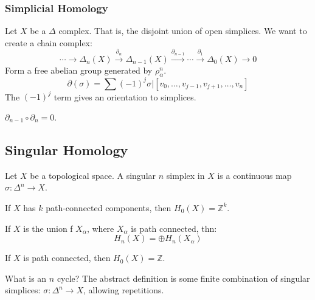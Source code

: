 \documentclass[crop=false,class=book,oneside]{standalone}
\begin{document}
            \subsubsection{Simplicial Homology}
                Let $X$ be a $\Delta$ complex. That is, the
                disjoint union of open simplices. We want to create
                a chain complex:
                \begin{equation}
                    \cdots\longrightarrow\Delta_{n}(X)
                    \overset{\partial_{n}}{\longrightarrow}
                    \Delta_{n-1}(X)
                    \overset{\partial_{n-1}}{\longrightarrow}
                    \cdots
                    \overset{\partial_{1}}{\longrightarrow}
                    \Delta_{0}(X)
                    \longrightarrow{0}
                \end{equation}
                Form a free abelian group generated by
                $\rho_{\alpha}^{n}$.
                \begin{equation}
                    \partial(\sigma)=
                    \sum(\minus{1})^{j}\sigma|
                    [v_{0},\dots,v_{j-1},v_{j+1},\dots,v_{n}]
                \end{equation}
                The $(\minus{1})^{j}$ term gives an orientation
                to simplices.
                \begin{theorem}
                    $\partial_{n-1}\circ\partial_{n}=0$.
                \end{theorem}
            \subsection{Singular Homology}
                Let $X$ be a topological space. A
                singular $n$ simplex in $X$ is a continuous map
                $\sigma:\Delta^{n}\rightarrow{X}$.
                \begin{theorem}
                    If $X$ has $k$ path-connected components, then
                    $H_{0}(X)=\mathbb{Z}^{k}$.
                \end{theorem}
                \begin{theorem}
                    If $X$ is the union f $X_{\alpha}$, where
                    $X_{\alpha}$ is path connected, thn:
                    \begin{equation}
                        H_{n}(X)=\oplus{H}_{n}(X_{\alpha})
                    \end{equation}
                \end{theorem}
                \begin{theorem}
                    If $X$ is path connected, then
                    $H_{0}(X)=\mathbb{Z}$.
                \end{theorem}
                What is an $n$ cycle? The abstract definition
                is some finite combination of singular simplices:
                $\sigma:\Delta^{n}\rightarrow{X}$, allowing
                repetitions.
\end{document}
